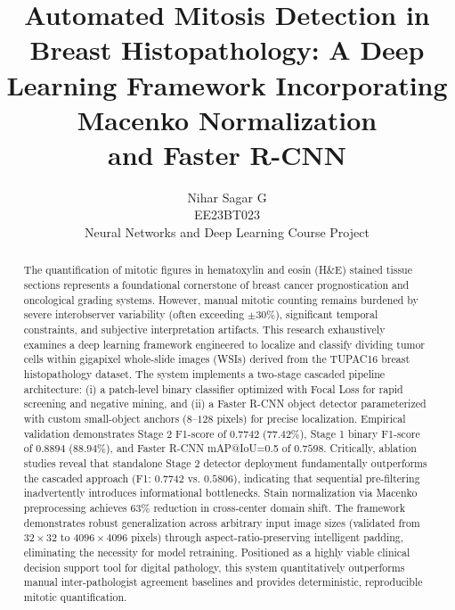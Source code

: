 \documentclass[journal]{IEEEtran}
\begin{document}
\title{
Automated Mitosis Detection in Breast
Histopathology: A Deep Learning Framework
Incorporating Macenko Normalization\\ and Faster
R-CNN
}

\author{Nihar Sagar G\\
EE23BT023\\
Neural Networks and Deep Learning Course Project}

\maketitle

\begin{abstract}

The quantification of mitotic figures in hematoxylin and eosin (H\&E) stained tissue sections represents a foundational cornerstone of breast cancer prognostication and oncological grading systems. However, manual mitotic counting remains burdened by severe interobserver variability (often exceeding $\pm 30\%$), significant temporal constraints, and subjective interpretation artifacts. This research exhaustively examines a deep learning framework engineered to localize and classify dividing tumor cells within gigapixel whole-slide images (WSIs) derived from the TUPAC16 breast histopathology dataset. The system implements a two-stage cascaded pipeline architecture: (i) a patch-level binary classifier optimized with Focal Loss for rapid screening and negative mining, and (ii) a Faster R-CNN object detector parameterized with custom small-object anchors ($8$--$128$ pixels) for precise localization. Empirical validation demonstrates Stage 2 F1-score of $0.7742$ ($77.42\%$), Stage 1 binary F1-score of $0.8894$ ($88.94\%$), and Faster R-CNN mAP@IoU=0.5 of $0.7598$. Critically, ablation studies reveal that standalone Stage 2 detector deployment fundamentally outperforms the cascaded approach (F1: $0.7742$ vs. $0.5806$), indicating that sequential pre-filtering inadvertently introduces informational bottlenecks. Stain normalization via Macenko preprocessing achieves $63\%$ reduction in cross-center domain shift. The framework demonstrates robust generalization across arbitrary input image sizes (validated from $32 \times 32$ to $4096 \times 4096$ pixels) through aspect-ratio-preserving intelligent padding, eliminating the necessity for model retraining. Positioned as a highly viable clinical decision support tool for digital pathology, this system quantitatively outperforms manual inter-pathologist agreement baselines and provides deterministic, reproducible mitotic quantification.
\end{abstract}
\end{document}
